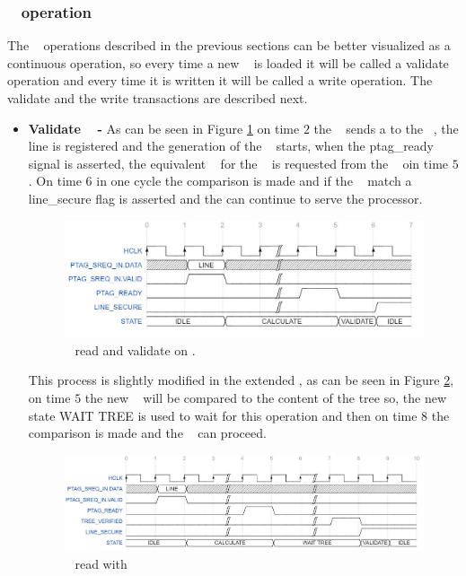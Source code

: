 \subsubsection{\seceng~ operation }
The \seceng~ operations described in the previous sections can be better visualized as a continuous operation, so every time a new \sline~  is loaded it will be called a validate operation and every time it is written it will be called a write operation. The validate and the write transactions are described next.


\begin{itemize}
 \item{\textbf{Validate \ptag~ - }} As can be seen in Figure \ref{fig:ptgag_rd_no_mt}  on time $2$ the \handler~ sends a  \sline to the \seceng~, the line is registered and the generation of the \ptag~ starts, when the ptag\_ready signal is asserted,  the equivalent \ptag~ for the \sline~ is requested from the \ptagmem~ oin time $5$. On time $6$ in one cycle the comparison is made and if the \ptags~ match a line\_secure flag is asserted and the \handler can continue to serve the processor.
 
   \begin{figure}[!ht]
    \centering
    \includegraphics[width=\textwidth]{figures/others/ptag_read_sec_eng.JPG}
    \caption{\ptag~ read and validate on \seceng.}
    \label{fig:ptgag_rd_no_mt}
\end{figure}
This process is slightly modified  in the extended \cshia, as can be seen in Figure  \ref{fig:ptgag_rd_mt}, on time $5$  the new \ptag~ will be compared to the content of the tree so, the new state WAIT TREE  is used to wait for this  operation and then  on time $8$ the comparison is made and the \seceng~ can proceed.   
\begin{figure}[!ht]
    \centering
    \includegraphics[width=\textwidth]{figures/others/ptag_read_tree_sec_eng.JPG}
    \caption{\ptag~ read with \mt }
    \label{fig:ptgag_rd_mt}
\end{figure}


\end{itemize}
